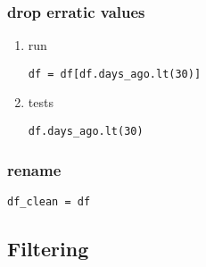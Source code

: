 \documentclass[11pt]{article}
\begin{document}
\subsubsection{drop erratic values}
\label{sec:orgef75dd9}
\begin{enumerate}
\item run
\label{sec:org8215081}
\begin{verbatim}
df = df[df.days_ago.lt(30)]
\end{verbatim}
\item tests
\label{sec:orgc692cd1}
\begin{verbatim}
df.days_ago.lt(30)
\end{verbatim}
\end{enumerate}
\subsubsection{rename}
\label{sec:org748c7b6}
\begin{verbatim}
df_clean = df
\end{verbatim}

\subsection{Filtering}
\label{sec:org72742f0}
\end{document}
